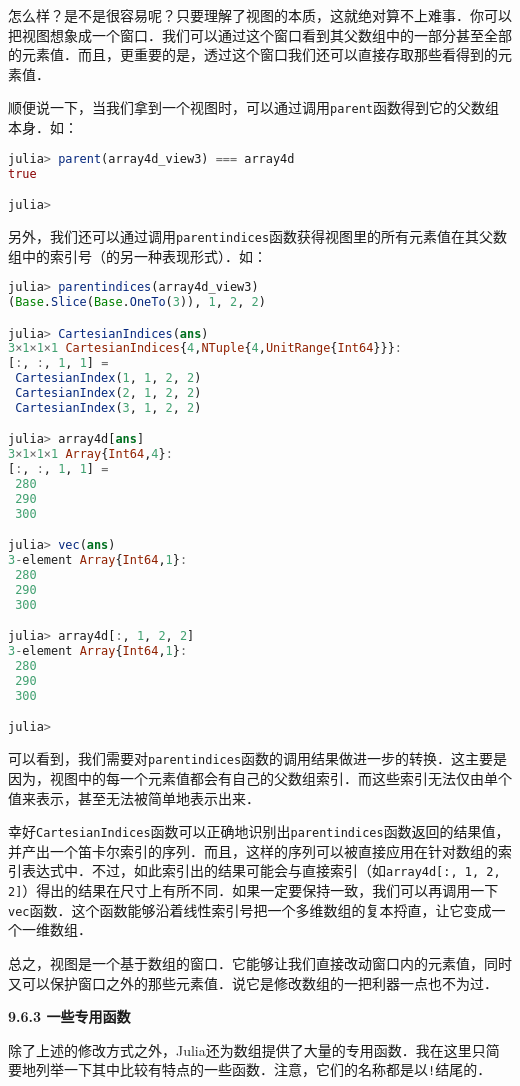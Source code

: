 怎么样？是不是很容易呢？只要理解了视图的本质，这就绝对算不上难事．你可以把视图想象成一个窗口．我们可以通过这个窗口看到其父数组中的一部分甚至全部的元素值．而且，更重要的是，透过这个窗口我们还可以直接存取那些看得到的元素值．

顺便说一下，当我们拿到一个视图时，可以通过调用\verb|parent|函数得到它的父数组本身．如：
\begin{lstlisting}[language=julia]
julia> parent(array4d_view3) === array4d
true

julia> 
\end{lstlisting}

另外，我们还可以通过调用\verb|parentindices|函数获得视图里的所有元素值在其父数组中的索引号（的另一种表现形式）．如：

\begin{lstlisting}[language=julia]
julia> parentindices(array4d_view3)
(Base.Slice(Base.OneTo(3)), 1, 2, 2)

julia> CartesianIndices(ans)
3×1×1×1 CartesianIndices{4,NTuple{4,UnitRange{Int64}}}:
[:, :, 1, 1] =
 CartesianIndex(1, 1, 2, 2)
 CartesianIndex(2, 1, 2, 2)
 CartesianIndex(3, 1, 2, 2)

julia> array4d[ans]
3×1×1×1 Array{Int64,4}:
[:, :, 1, 1] =
 280
 290
 300

julia> vec(ans)
3-element Array{Int64,1}:
 280
 290
 300

julia> array4d[:, 1, 2, 2]
3-element Array{Int64,1}:
 280
 290
 300

julia> 
\end{lstlisting}

可以看到，我们需要对\verb|parentindices|函数的调用结果做进一步的转换．这主要是因为，视图中的每一个元素值都会有自己的父数组索引．而这些索引无法仅由单个值来表示，甚至无法被简单地表示出来．

幸好\verb|CartesianIndices|函数可以正确地识别出\verb|parentindices|函数返回的结果值，并产出一个笛卡尔索引的序列．而且，这样的序列可以被直接应用在针对数组的索引表达式中．不过，如此索引出的结果可能会与直接索引（如\verb|array4d[:, 1, 2, 2]|）得出的结果在尺寸上有所不同．如果一定要保持一致，我们可以再调用一下\verb|vec|函数．这个函数能够沿着线性索引号把一个多维数组的复本捋直，让它变成一个一维数组．

总之，视图是一个基于数组的窗口．它能够让我们直接改动窗口内的元素值，同时又可以保护窗口之外的那些元素值．说它是修改数组的一把利器一点也不为过．

\textbf{9.6.3 一些专用函数}

除了上述的修改方式之外，Julia还为数组提供了大量的专用函数．我在这里只简要地列举一下其中比较有特点的一些函数．注意，它们的名称都是以\verb|!|结尾的．

